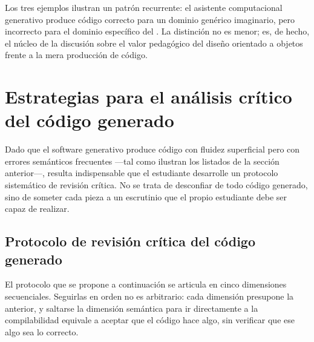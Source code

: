 Los tres ejemplos ilustran un patrón recurrente: el asistente computacional
generativo produce código correcto para un dominio genérico imaginario, pero
incorrecto para el dominio específico del \acuerdo. La distinción no es menor;
es, de hecho, el núcleo de la discusión sobre el valor pedagógico del diseño
orientado a objetos frente a la mera producción de código.

\section{Estrategias para el análisis crítico del código generado}
\label{sec:analisis-critico}

\noindent
Dado que el software generativo produce código con fluidez superficial
pero con errores semánticos frecuentes ---tal como ilustran los listados de la
sección anterior---, resulta indispensable que el estudiante desarrolle un
protocolo sistemático de revisión crítica. No se trata de desconfiar de todo
código generado, sino de someter cada pieza a un escrutinio que el propio
estudiante debe ser capaz de realizar.

\subsection{Protocolo de revisión crítica del código generado}
\label{subsec:protocolo-revision}

El protocolo que se propone a continuación se articula en cinco dimensiones
secuenciales. Seguirlas en orden no es arbitrario: cada dimensión presupone
la anterior, y saltarse la dimensión semántica para ir directamente a la
compilabilidad equivale a aceptar que el código hace algo, sin verificar
que ese algo sea lo correcto.


